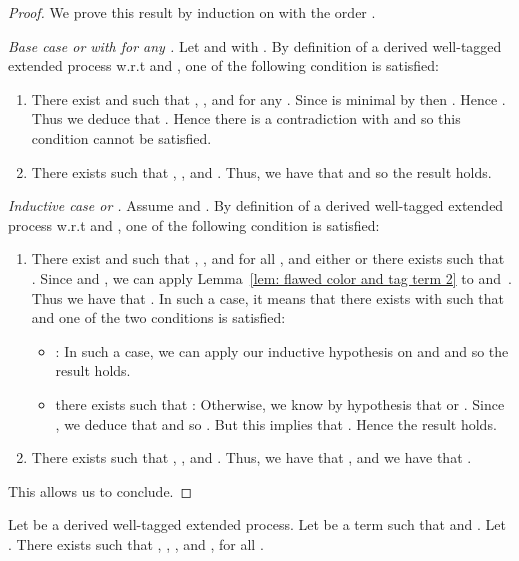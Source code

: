 \begin{proof}
We prove this result by induction on 
with the order .

\smallskip{}

\noindent \emph{Base case  or  with  for any .} Let  and  with .
By definition of a derived well-tagged extended process w.r.t  and , one of the
following condition is satisfied:
\begin{enumerate}
\item There exist  and  such that , , and  for any . Since  is minimal by  then . Hence . Thus we deduce that . Hence there is a contradiction with  and so this condition cannot be satisfied.
\item There exists  such that , , and . Thus, we have that  and so the result holds.
  \end{enumerate}
  
  \medskip{}
  
\noindent \emph{Inductive case  or .} Assume  and .
By definition of a derived well-tagged extended process w.r.t  and , one of the
following condition is satisfied:  
\begin{enumerate}
\item There exist  and  such that
  , , and for all ,  and either  or there exists  such that .
  Since  and , we can apply Lemma~\ref{lem: flawed color and tag term 2}
 to  and~. Thus we have that . In such a case, it means that there exists  with  such that  and one of the two conditions is satisfied:
 \begin{itemize}
 \item : In such a case, we can apply our inductive hypothesis on  and  and so the result holds.
 \item there exists  such that : Otherwise, we know by hypothesis that  or . Since , we deduce that  and so . But this implies that . Hence the result holds.
 \end{itemize}
\item There exists  such that , , and . Thus, we have that , and we
  have that .
\end{enumerate}
This allows us to conclude.
\end{proof}



\begin{lemma}
  \label{lem:flawed,smallerrecipe}
  Let  be a derived well-tagged extended process. Let  be a term such that  and . Let .  There exists  such that , , , and , for all .
\end{lemma}


